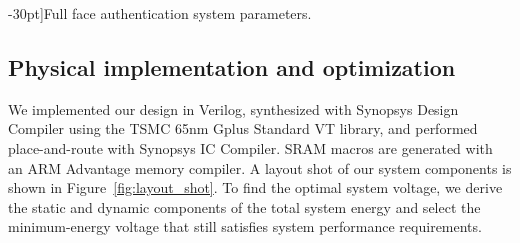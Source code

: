 \begin{table}[h]
  \caption[][-30pt]{Full face authentication system parameters.}
  \label{table:fa-hardware}

\end{table}

\subsection{Physical implementation and optimization}

We implemented our design in Verilog, synthesized with Synopsys Design Compiler using the TSMC 65nm Gplus Standard VT library, and performed place-and-route with Synopsys IC Compiler. SRAM macros are generated with an ARM Advantage memory compiler. A layout shot of our system components is shown in Figure~\ref{fig:layout_shot}. To find the optimal system voltage, we derive the static and dynamic components of the total system energy and select the minimum-energy voltage that still satisfies system performance requirements.

